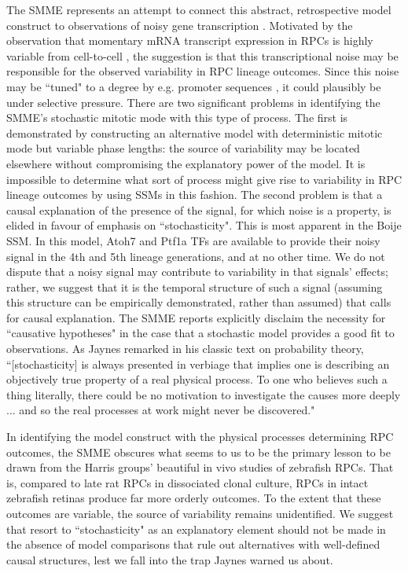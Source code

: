 \documentclass{ut-thesis}
\begin{document}
\begin{NoHyper}
The SMME represents an attempt to connect this abstract, retrospective model construct to observations of noisy gene transcription \cite{Raj2008}. Motivated by the observation that momentary mRNA transcript expression in RPCs is highly variable from cell-to-cell \cite{Trimarchi2008}, the suggestion is that this transcriptional noise may be responsible for the observed variability in RPC lineage outcomes. Since this noise may be ``tuned" to a degree by e.g. promoter sequences \cite{Raser2004}, it could plausibly be under selective pressure. There are two significant problems in identifying the SMME's stochastic mitotic mode with this type of process. The first is demonstrated by constructing an alternative model with deterministic mitotic mode but variable phase lengths: the source of variability may be located elsewhere without compromising the explanatory power of the model. It is impossible to determine what sort of process might give rise to variability in RPC lineage outcomes by using SSMs in this fashion. The second problem is that a causal explanation of the presence of the signal, for which noise is a property, is elided in favour of emphasis on ``stochasticity". This is most apparent in the Boije SSM. In this model, Atoh7 and Ptf1a TFs are available to provide their noisy signal in the 4th and 5th lineage generations, and at no other time. We do not dispute that a noisy signal may contribute to variability in that signals' effects; rather, we suggest that it is the temporal structure of such a signal (assuming this structure can be empirically demonstrated, rather than assumed) that calls for causal explanation. The SMME reports explicitly disclaim the necessity for ``causative hypotheses" in the case that a stochastic model provides a good fit to observations. As Jaynes remarked in his classic text on probability theory, ``[stochasticity] is always presented in verbiage that implies one is describing an objectively true property of a real physical process. To one who believes such a thing literally, there could be no motivation to investigate the causes more deeply ... and so the real processes at work might never be discovered." \cite{Jaynes2003} 

In identifying the model construct with the physical processes determining RPC outcomes, the SMME obscures what seems to us to be the primary lesson to be drawn from the Harris groups' beautiful in vivo studies of zebrafish RPCs. That is, compared to late rat RPCs in dissociated clonal culture, RPCs in intact zebrafish retinas produce far more orderly outcomes. To the extent that these outcomes are variable, the source of variability remains unidentified. We suggest that resort to ``stochasticity" as an explanatory element should not be made in the absence of model comparisons that rule out alternatives with well-defined causal structures, lest we fall into the trap Jaynes warned us about.

\end{NoHyper}
\end{document}
